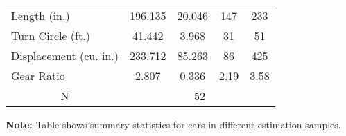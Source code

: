 \begin{table}[htbp]
\begin{tabular}{l c c c c }
Length (in.) & 196.135 & 20.046 & 147 & 233 \\
Turn Circle (ft.) & 41.442 & 3.968 & 31 & 51 \\
Displacement (cu. in.) & 233.712 & 85.263 & 86 & 425 \\
Gear Ratio & 2.807 & 0.336 & 2.19 & 3.58 \\
\multicolumn{1}{c}{N} & \multicolumn{4}{c}{52}\\ \hline\hline\end{tabular}
\begin{minipage}{\linewidth} \footnotesize \smallskip \textbf{Note:} Table shows summary statistics for cars in different estimation samples.\end{minipage}  \end{table}
